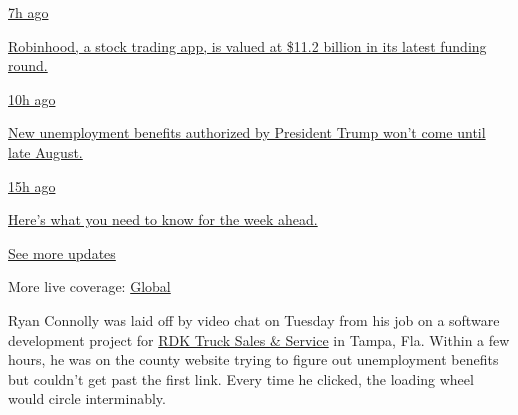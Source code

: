 \href{https://www.nytimes.com/live/2020/08/17/business/stock-market-today-coronavirus?action=click\&pgtype=Article\&state=default\&region=MAIN_CONTENT_1\&context=storylines_live_updates\#robinhood-a-stock-trading-app-is-valued-at-11-2-billion-in-its-latest-funding-round}{7h
ago}

\href{https://www.nytimes.com/live/2020/08/17/business/stock-market-today-coronavirus?action=click\&pgtype=Article\&state=default\&region=MAIN_CONTENT_1\&context=storylines_live_updates\#robinhood-a-stock-trading-app-is-valued-at-11-2-billion-in-its-latest-funding-round}{Robinhood,
a stock trading app, is valued at \$11.2 billion in its latest funding
round.}

\href{https://www.nytimes.com/live/2020/08/17/business/stock-market-today-coronavirus?action=click\&pgtype=Article\&state=default\&region=MAIN_CONTENT_1\&context=storylines_live_updates\#new-unemployment-benefits-authorized-by-president-trump-wont-come-until-late-august}{10h
ago}

\href{https://www.nytimes.com/live/2020/08/17/business/stock-market-today-coronavirus?action=click\&pgtype=Article\&state=default\&region=MAIN_CONTENT_1\&context=storylines_live_updates\#new-unemployment-benefits-authorized-by-president-trump-wont-come-until-late-august}{New
unemployment benefits authorized by President Trump won't come until
late August.}

\href{https://www.nytimes.com/live/2020/08/17/business/stock-market-today-coronavirus?action=click\&pgtype=Article\&state=default\&region=MAIN_CONTENT_1\&context=storylines_live_updates\#heres-what-you-need-to-know-for-the-week-ahead}{15h
ago}

\href{https://www.nytimes.com/live/2020/08/17/business/stock-market-today-coronavirus?action=click\&pgtype=Article\&state=default\&region=MAIN_CONTENT_1\&context=storylines_live_updates\#heres-what-you-need-to-know-for-the-week-ahead}{Here's
what you need to know for the week ahead.}

\href{https://www.nytimes.com/live/2020/08/17/business/stock-market-today-coronavirus?action=click\&pgtype=Article\&state=default\&region=MAIN_CONTENT_1\&context=storylines_live_updates}{See
more updates}

More live coverage:
\href{https://www.nytimes.com/2020/08/17/world/coronavirus-covid.html?action=click\&pgtype=Article\&state=default\&region=MAIN_CONTENT_1\&context=storylines_live_updates}{Global}

Ryan Connolly was laid off by video chat on Tuesday from his job on a
software development project for \href{https://www.rdk.com/}{RDK Truck
Sales \& Service} in Tampa, Fla. Within a few hours, he was on the
county website trying to figure out unemployment benefits but couldn't
get past the first link. Every time he clicked, the loading wheel would
circle interminably.

